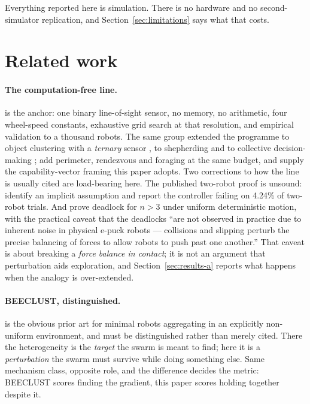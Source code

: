 \documentclass[11pt,a4paper]{article}
\begin{document}
Everything reported here is simulation. There is no hardware and no
second-simulator replication, and Section~\ref{sec:limitations} says what that
costs.

\section{Related work}
\label{sec:related}

\paragraph{The computation-free line.} \citet{gauci2014} is the anchor: one
binary line-of-sight sensor, no memory, no arithmetic, four wheel-speed
constants, exhaustive grid search at that resolution, and empirical validation to
a thousand robots. The same group extended the programme to object clustering
with a \emph{ternary} sensor \citep{gauci2014aamas}, to shepherding
\citep{ozdemir2017} and to collective decision-making \citep{ozdemir2018};
\citet{johnson2015} add perimeter, rendezvous and foraging at the same budget,
and \citet{brown2016} supply the capability-vector framing this paper adopts.
Two corrections to how the line is usually cited are load-bearing here. The
published two-robot proof is unsound: \citet{steinberg2025} identify an implicit
assumption and report the controller failing on 4.24\% of two-robot trials. And
\citet{daymude2021} prove deadlock for $n > 3$ under uniform deterministic
motion, with the practical caveat that the deadlocks ``are not observed in
practice due to inherent noise in physical e-puck robots --- collisions and
slipping perturb the precise balancing of forces to allow robots to push past
one another.'' That caveat is about breaking a \emph{force balance in contact};
it is not an argument that perturbation aids exploration, and Section~\ref{sec:results-a}
reports what happens when the analogy is over-extended.

\paragraph{BEECLUST, distinguished.} \citet{schmickl2008} is the obvious prior
art for minimal robots aggregating in an explicitly non-uniform environment, and
must be distinguished rather than merely cited. There the heterogeneity is the
\emph{target} the swarm is meant to find; here it is a \emph{perturbation} the
swarm must survive while doing something else. Same mechanism class, opposite
role, and the difference decides the metric: BEECLUST scores finding the
gradient, this paper scores holding together despite it.
\end{document}
